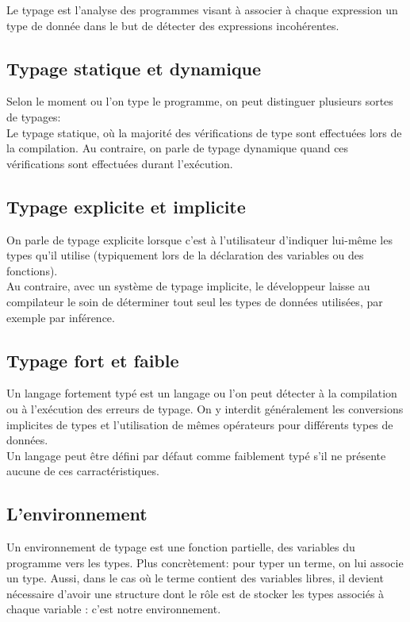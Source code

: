 \documentclass[a4paper, 11pt]{article}
\begin{document}
Le typage est l’analyse des programmes visant à associer à chaque expression un type de donnée dans le but de détecter des expressions incohérentes.
\subsection {Typage statique et dynamique}
Selon le moment ou l'on type le programme, on peut distinguer plusieurs sortes de typages:\\
Le typage statique, où la majorité des vérifications de type sont effectuées lors de la compilation.
Au contraire, on parle de typage dynamique quand ces vérifications sont effectuées durant l'exécution.

\subsection {Typage explicite et implicite}
On parle de typage explicite lorsque c'est à l'utilisateur d'indiquer lui-même les types qu'il utilise (typiquement lors de la déclaration des variables ou des fonctions).\\
Au contraire, avec un système de typage implicite, le développeur laisse au compilateur le soin de déterminer tout seul les types de données utilisées, par exemple par inférence.

\subsection {Typage fort et faible}
Un langage fortement typé est un langage ou l'on peut détecter à la compilation ou à l'exécution des erreurs de typage.
On y interdit généralement les conversions implicites de types et l'utilisation de mêmes opérateurs pour différents types de données.\\
Un langage peut être défini par défaut comme faiblement typé s'il ne présente aucune de ces carractéristiques.

\subsection {L'environnement}
Un environnement de typage est une fonction partielle, des variables du programme vers les types. Plus concrètement:
pour typer un terme, on lui associe un type. Aussi, dans le cas où le terme contient des variables libres, il devient nécessaire d'avoir une structure dont le rôle est de stocker les types associés à chaque variable : c'est notre environnement.
\end{document}
